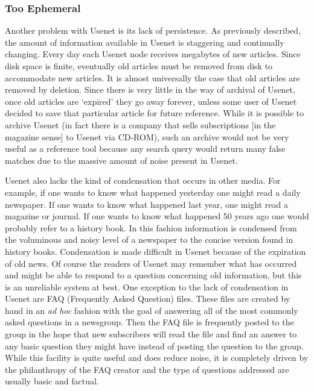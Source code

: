 \subsubsection{Too Ephemeral}
\label{tooephemeral}

Another problem with Usenet is its lack of persistence. As previously
described, the amount of information available in Usenet is staggering and
continually changing. Every day each Usenet node receives megabytes of new
articles. Since disk space is finite, eventually old articles must be removed
from disk to accommodate new articles. It is almost universally the case that
old articles are removed by deletion.  Since there is very little in the way of
archival of Usenet, once old articles are `expired' they go away forever,
unless some user of Usenet decided to save that particular article for future
reference.  While it is possible to archive Usenet (in fact there is a company
that sells subscriptions [in the magazine sense] to Usenet via
CD-ROM), such an archive would not be very
useful as a reference tool because any search query would return many false
matches due to the massive amount of noise present in Usenet.


Usenet also lacks the kind of condensation that occurs in other media. For
example, if one wants to know what happened yesterday one might read a daily
newspaper. If one wants to know what happened last year, one might read a
magazine or journal. If one wants to know what happened 50 years ago one
would probably refer to a history book. In this fashion information is
condensed from the voluminous and noisy level of a newspaper to the concise
version found in history books. Condensation is made difficult in Usenet
because of the expiration of old news. Of course the readers of Usenet may
remember what has occurred and might be able to respond to a question
concerning old information, but this is an unreliable system at best. One
exception to the lack of condensation in Usenet are FAQ (Frequently Asked
Question) files. These files are created by hand in an {\em ad hoc}\/
fashion with the goal of answering all of the most commonly asked questions
in a newsgroup. Then the FAQ file is frequently posted to the group in the
hope that new subscribers will read the file and find an answer to any basic
question they might have instead of posting the question to the group. While
this facility is quite useful and does reduce noise, it is completely driven
by the philanthropy of the FAQ creator and the type of questions addressed
are usually basic and factual.


